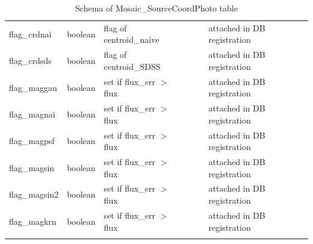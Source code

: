 \documentclass[12pt]{article}
\begin{document}
\begin{table}[thpb]
\begin{center}
{\begin{tabular}{llllll}
flag\_crdnai & boolean & flag of centroid\_naive                              &                            &             & attached in DB registration  \\
flag\_crdsds & boolean & flag of centroid\_SDSS                               &                            &             & attached in DB registration  \\
flag\_maggau & boolean & set if flux\_err $>$ flux                              &                            &             & attached in DB registration  \\
flag\_magnai & boolean & set if flux\_err $>$ flux                              &                            &             & attached in DB registration  \\
flag\_magpsf & boolean & set if flux\_err $>$ flux                              &                            &             & attached in DB registration  \\
flag\_magsin & boolean & set if flux\_err $>$ flux                              &                            &             & attached in DB registration  \\
flag\_magsin2 & boolean & set if flux\_err $>$ flux                              &                            &             & attached in DB registration  \\
flag\_magkrn & boolean & set if flux\_err $>$ flux                              &                            &             & attached in DB registration  \\
\hline\\
\end{tabular}
}
\caption{Schema of Mosaic\_SourceCoordPhoto table}
\end{center}
\end{table}
\end{document}
